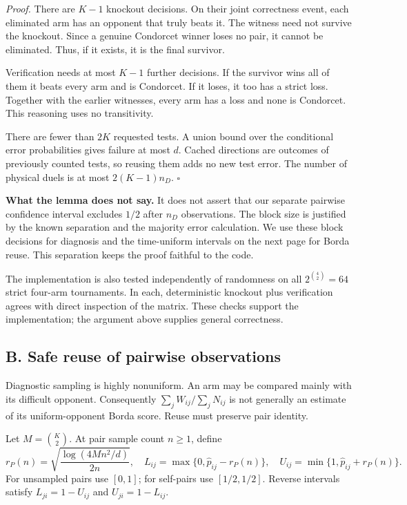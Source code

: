 \documentclass[11pt,a4paper]{article}
\begin{document}
\emph{Proof.} There are $K-1$ knockout decisions. On their joint correctness event, each eliminated arm has an opponent that truly beats it. The witness need not survive the knockout. Since a genuine Condorcet winner loses no pair, it cannot be eliminated. Thus, if it exists, it is the final survivor.

Verification needs at most $K-1$ further decisions. If the survivor wins all of them it beats every arm and is Condorcet. If it loses, it too has a strict loss. Together with the earlier witnesses, every arm has a loss and none is Condorcet. This reasoning uses no transitivity.

There are fewer than $2K$ requested tests. A union bound over the conditional error probabilities gives failure at most $d$. Cached directions are outcomes of previously counted tests, so reusing them adds no new test error. The number of physical duels is at most $2(K-1)n_D$. \hfill$\square$

\textbf{What the lemma does not say.} It does not assert that our separate pairwise confidence interval excludes $1/2$ after $n_D$ observations. The block size is justified by the known separation and the majority error calculation. We use these block decisions for diagnosis and the time-uniform intervals on the next page for Borda reuse. This separation keeps the proof faithful to the code.

The implementation is also tested independently of randomness on all $2^{\binom42}=64$ strict four-arm tournaments. In each, deterministic knockout plus verification agrees with direct inspection of the matrix. These checks support the implementation; the argument above supplies general correctness.

\subsection{B. Safe reuse of pairwise observations}

Diagnostic sampling is highly nonuniform. An arm may be compared mainly with its difficult opponent. Consequently $\sum_jW_{ij}/\sum_jN_{ij}$ is not generally an estimate of its uniform-opponent Borda score. Reuse must preserve pair identity.

Let $M=\binom K2$. At pair sample count $n\ge1$, define
\[
r_P(n)=\sqrt{\frac{\log(4Mn^2/d)}{2n}},\quad
L_{ij}=\max\{0,\widehat p_{ij}-r_P(n)\},\quad
U_{ij}=\min\{1,\widehat p_{ij}+r_P(n)\}.
\]
For unsampled pairs use $[0,1]$; for self-pairs use $[1/2,1/2]$. Reverse intervals satisfy $L_{ji}=1-U_{ij}$ and $U_{ji}=1-L_{ij}$.
\end{document}
